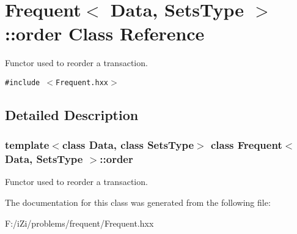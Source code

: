 \section{Frequent$<$ Data, Sets\-Type $>$::order Class Reference}
\label{class_frequent_1_1order}
Functor used to reorder a transaction.  


{\tt \#include $<$Frequent.hxx$>$}



\subsection{Detailed Description}
\subsubsection*{template$<$class Data, class Sets\-Type$>$ class Frequent$<$ Data, Sets\-Type $>$::order}

Functor used to reorder a transaction. 



The documentation for this class was generated from the following file:\begin{CompactItemize}
\item 
F:/i\-Zi/problems/frequent/Frequent.hxx\end{CompactItemize}
